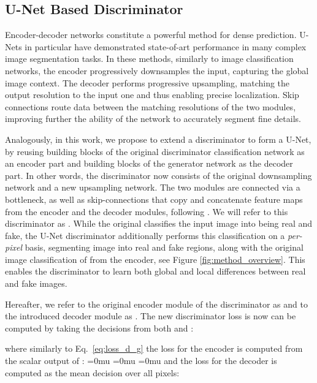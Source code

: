 \documentclass[10pt,twocolumn,letterpaper]{article}
\begin{document}
 

\subsection{U-Net Based Discriminator}\label{subsec:method-unet}


Encoder-decoder networks \cite{badrinarayanan2017segnet,Ronneberger2015UNetCN} constitute a powerful method for dense prediction. U-Nets \cite{Ronneberger2015UNetCN} in particular have demonstrated state-of-art performance in many complex image segmentation tasks. In these methods, similarly to image classification networks, the encoder progressively downsamples the input, capturing the global image context.
The decoder performs progressive upsampling, matching the output resolution to the input one and thus enabling precise localization. Skip connections route data between the matching resolutions of the two modules, improving further the ability of the network to accurately segment fine details.

Analogously, in this work, we propose to extend a discriminator to form a U-Net, by reusing building blocks of the original discriminator classification network as an encoder part and building blocks of the generator network as the decoder part. In other words, the discriminator now consists of the original downsampling network and a new upsampling network. The two modules are connected via a bottleneck, as well as skip-connections that copy and concatenate feature maps from the encoder and the decoder modules, following \cite{Ronneberger2015UNetCN}.  We will refer to this discriminator as . While the original  classifies the input image  into being real and fake, the U-Net discriminator  additionally performs this classification on a \textit{per-pixel} basis, segmenting image  into real and fake regions, along with the original image classification of  from the encoder, see Figure \ref{fig:method_overview}. This enables the discriminator to learn both global and local differences between real and fake images.



Hereafter, we refer to the original encoder module of the discriminator as  and to the introduced decoder module as . The new discriminator loss is now can be computed by taking the decisions from both  and :

where similarly to Eq.~\ref{eq:loss_d_g} the loss for the encoder  is computed from the scalar output of :
{\medmuskip=0mu
\thinmuskip=0mu
\thickmuskip=0mu
 }and the loss for the decoder  is computed as the mean decision over all pixels:
\end{document}
